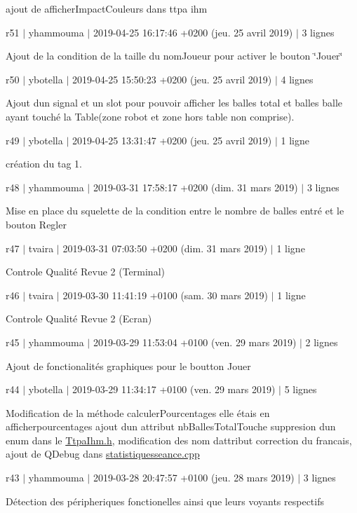 ajout de afficher\+Impact\+Couleurs dans ttpa ihm

r51 $\vert$ yhammouma $\vert$ 2019-\/04-\/25 16\+:17\+:46 +0200 (jeu. 25 avril 2019) $\vert$ 3 lignes

Ajout de la condition de la taille du nom\+Joueur pour activer le bouton \char`\"{}\+Jouer\char`\"{}

r50 $\vert$ ybotella $\vert$ 2019-\/04-\/25 15\+:50\+:23 +0200 (jeu. 25 avril 2019) $\vert$ 4 lignes

Ajout d\textquotesingle{}un signal et un slot pour pouvoir afficher les balles total et balles balle ayant touché la Table(zone robot et zone hors table non comprise).

r49 $\vert$ ybotella $\vert$ 2019-\/04-\/25 13\+:31\+:47 +0200 (jeu. 25 avril 2019) $\vert$ 1 ligne

création du tag 1.

r48 $\vert$ yhammouma $\vert$ 2019-\/03-\/31 17\+:58\+:17 +0200 (dim. 31 mars 2019) $\vert$ 3 lignes

Mise en place du squelette de la condition entre le nombre de balles entré et le bouton Regler

r47 $\vert$ tvaira $\vert$ 2019-\/03-\/31 07\+:03\+:50 +0200 (dim. 31 mars 2019) $\vert$ 1 ligne

Controle Qualité Revue 2 (Terminal)

r46 $\vert$ tvaira $\vert$ 2019-\/03-\/30 11\+:41\+:19 +0100 (sam. 30 mars 2019) $\vert$ 1 ligne

Controle Qualité Revue 2 (Ecran)

r45 $\vert$ yhammouma $\vert$ 2019-\/03-\/29 11\+:53\+:04 +0100 (ven. 29 mars 2019) $\vert$ 2 lignes

Ajout de fonctionalités graphiques pour le boutton Jouer

r44 $\vert$ ybotella $\vert$ 2019-\/03-\/29 11\+:34\+:17 +0100 (ven. 29 mars 2019) $\vert$ 5 lignes

Modification de la méthode calculer\+Pourcentages elle étais en afficherpourcentages ajout d\textquotesingle{}un attribut nb\+Balles\+Total\+Touche suppresion d\textquotesingle{}un enum dans le \hyperlink{ttpaihm_8h}{Ttpa\+Ihm.\+h}, modification des nom d\textquotesingle{}attribut correction du francais, ajout de Q\+Debug dans \hyperlink{statistiquesseance_8cpp}{statistiquesseance.\+cpp}

r43 $\vert$ yhammouma $\vert$ 2019-\/03-\/28 20\+:47\+:57 +0100 (jeu. 28 mars 2019) $\vert$ 3 lignes

Détection des péripheriques fonctionelles ainsi que leurs voyants respectifs

